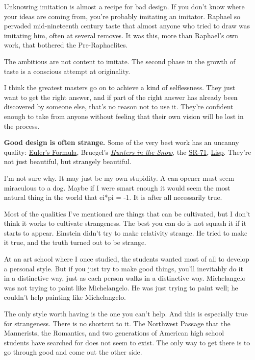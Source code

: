 \documentclass[12pt]{book}
\begin{document}
Unknowing imitation is almost a recipe for bad design. If you don't know
where your ideas are coming from, you're probably imitating an imitator.
Raphael so pervaded mid-nineteenth century taste that almost anyone who
tried to draw was imitating him, often at several removes. It was this,
more than Raphael's own work, that bothered the Pre-Raphaelites.

The ambitious are not content to imitate. The second phase in the growth
of taste is a conscious attempt at originality.

I think the greatest masters go on to achieve a kind of selflessness.
They just want to get the right answer, and if part of the right answer
has already been discovered by someone else, that's no reason not to use
it. They're confident enough to take from anyone without feeling that
their own vision will be lost in the process.

\textbf{Good design is often strange.} Some of the very best work has an
uncanny quality:
\href{http://mathworld.wolfram.com/EulerFormula.html}{Euler's Formula},
Bruegel's \emph{\href{hunters.html}{Hunters in the Snow},} the
\href{sr71.html}{SR-71}, \href{rootsoflisp.html}{Lisp}. They're not just
beautiful, but strangely beautiful.

I'm not sure why. It may just be my own stupidity. A can-opener must
seem miraculous to a dog. Maybe if I were smart enough it would seem the
most natural thing in the world that ei*pi = -1. It is after all
necessarily true.

Most of the qualities I've mentioned are things that can be cultivated,
but I don't think it works to cultivate strangeness. The best you can do
is not squash it if it starts to appear. Einstein didn't try to make
relativity strange. He tried to make it true, and the truth turned out
to be strange.

At an art school where I once studied, the students wanted most of all
to develop a personal style. But if you just try to make good things,
you'll inevitably do it in a distinctive way, just as each person walks
in a distinctive way. Michelangelo was not trying to paint like
Michelangelo. He was just trying to paint well; he couldn't help
painting like Michelangelo.

The only style worth having is the one you can't help. And this is
especially true for strangeness. There is no shortcut to it. The
Northwest Passage that the Mannerists, the Romantics, and two
generations of American high school students have searched for does not
seem to exist. The only way to get there is to go through good and come
out the other side.
\end{document}
